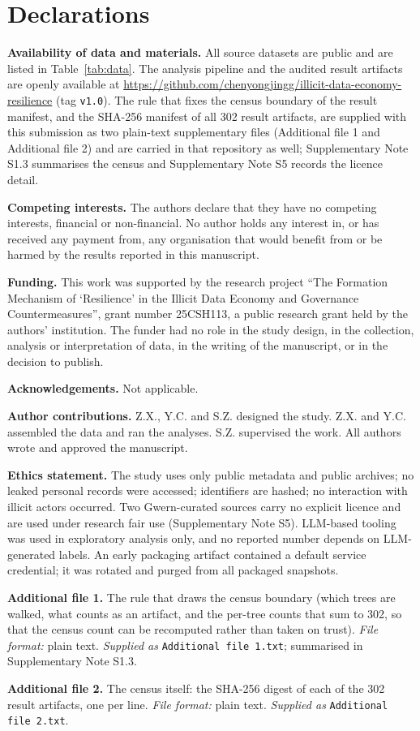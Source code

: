 \documentclass[10pt,a4paper]{article}
\begin{document}
\bigskip
\begingroup\small
\section*{Declarations}

\noindent\textbf{Availability of data and materials.} All source datasets are
public and are listed in Table~\ref{tab:data}. The analysis pipeline and the
audited result artifacts are openly available at
\url{https://github.com/chenyongjingg/illicit-data-economy-resilience}
(tag \texttt{v1.0}). The rule that fixes the census boundary of the result
manifest, and the SHA-256 manifest of all 302 result artifacts, are supplied
with this submission as two plain-text supplementary files (Additional file 1
and Additional file 2) and are carried in that repository as well;
Supplementary Note S1.3 summarises the census and Supplementary Note S5
records the licence detail.

\noindent\textbf{Competing interests.} The authors declare that they have no
competing interests, financial or non-financial. No author holds any interest
in, or has received any payment from, any organisation that would benefit from
or be harmed by the results reported in this manuscript.

\noindent\textbf{Funding.} This work was supported by the research project
``The Formation Mechanism of `Resilience' in the Illicit Data Economy and
Governance Countermeasures'', grant number 25CSH113, a public research grant
held by the authors' institution. The funder had no role in the study design, in
the collection, analysis or interpretation of data, in the writing of the
manuscript, or in the decision to publish.

\noindent\textbf{Acknowledgements.} Not applicable.

\noindent\textbf{Author contributions.} Z.X., Y.C. and S.Z. designed the study.
Z.X. and Y.C. assembled the data and ran the analyses. S.Z. supervised the
work. All authors wrote and approved the manuscript.

\noindent\textbf{Ethics statement.} The study uses only public metadata and
public archives; no leaked personal records were accessed; identifiers are
hashed; no interaction with illicit actors occurred. Two Gwern-curated sources
carry no explicit licence and are used under research fair use (Supplementary
Note S5). LLM-based tooling was used in exploratory analysis only, and no
reported number depends on LLM-generated labels. An early packaging artifact
contained a default service credential; it was rotated and purged from all
packaged snapshots.

\noindent\textbf{Additional file 1.} The rule that draws the census boundary
(which trees are walked, what counts as an artifact, and the per-tree counts that
sum to 302, so that the census count can be recomputed rather than taken on
trust). \emph{File format:} plain text. \emph{Supplied as}
\texttt{Additional file 1.txt}; summarised in Supplementary Note S1.3.

\noindent\textbf{Additional file 2.} The census itself: the SHA-256 digest of
each of the 302 result artifacts, one per line. \emph{File format:} plain text.
\emph{Supplied as} \texttt{Additional file 2.txt}.

\endgroup
\end{document}
